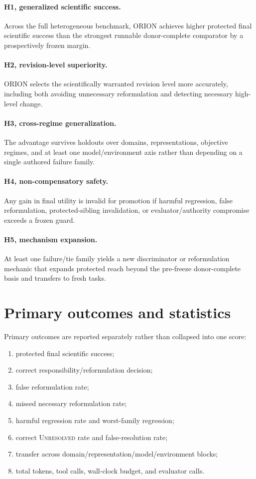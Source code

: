 \documentclass[11pt]{article}
\begin{document}
\paragraph{H1, generalized scientific success.}
Across the full heterogeneous benchmark, ORION achieves higher protected final scientific success than the strongest runnable donor-complete comparator by a prospectively frozen margin.

\paragraph{H2, revision-level superiority.}
ORION selects the scientifically warranted revision level more accurately, including both avoiding unnecessary reformulation and detecting necessary high-level change.

\paragraph{H3, cross-regime generalization.}
The advantage survives holdouts over domains, representations, objective regimes, and at least one model/environment axis rather than depending on a single authored failure family.

\paragraph{H4, non-compensatory safety.}
Any gain in final utility is invalid for promotion if harmful regression, false reformulation, protected-sibling invalidation, or evaluator/authority compromise exceeds a frozen guard.

\paragraph{H5, mechanism expansion.}
At least one failure/tie family yields a new discriminator or reformulation mechanic that expands protected reach beyond the pre-freeze donor-complete basis and transfers to fresh tasks.

\section{Primary outcomes and statistics}
Primary outcomes are reported separately rather than collapsed into one score:
\begin{enumerate}[leftmargin=*]
    \item protected final scientific success;
    \item correct responsibility/reformulation decision;
    \item false reformulation rate;
    \item missed necessary reformulation rate;
    \item harmful regression rate and worst-family regression;
    \item correct \textsc{Unresolved} rate and false-resolution rate;
    \item transfer across domain/representation/model/environment blocks;
    \item total tokens, tool calls, wall-clock budget, and evaluator calls.
\end{enumerate}
\end{document}
